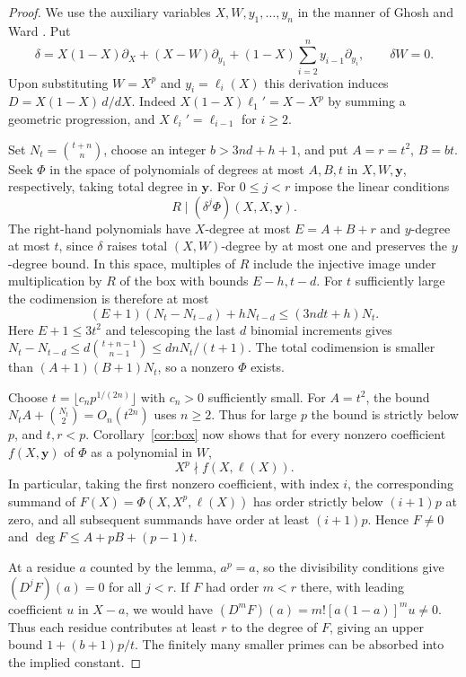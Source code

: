 \begin{proof}
We use the auxiliary variables $X,W,y_1,\ldots,y_n$ in the manner of
Ghosh and Ward \cite[\S3]{GW}. Put
\[
 \delta=X(1-X)\partial_X+(X-W)\partial_{y_1}
             +(1-X)\sum_{i=2}^n y_{i-1}\partial_{y_i},
 \qquad \delta W=0.
\]
Upon substituting $W=X^p$ and $y_i=\ell_i(X)$ this derivation induces
$D=X(1-X)\,d/dX$. Indeed $X(1-X)\ell_1'=X-X^p$ by summing a geometric
progression, and $X\ell_i'=\ell_{i-1}$ for $i\ge2$.

Set $N_t=\binom{t+n}{n}$, choose an integer $b>3nd+h+1$, and put
$A=r=t^2$, $B=bt$. Seek $\Phi$ in the space of polynomials of
degrees at most $A,B,t$ in $X,W,\boldsymbol y$, respectively, taking
total degree in $\boldsymbol y$. For $0\le j<r$ impose the linear conditions
\[
             R\mid (\delta^j\Phi)(X,X,\boldsymbol y).
\]
The right-hand polynomials have $X$-degree at most $E=A+B+r$ and
$y$-degree at most $t$, since $\delta$ raises total $(X,W)$-degree by
at most one and preserves the $y$-degree bound. In this space, multiples
of $R$ include the injective image under multiplication by $R$ of the
box with bounds $E-h,t-d$. For $t$ sufficiently large the codimension is
therefore at most
\[
 (E+1)(N_t-N_{t-d})+hN_{t-d}
       \le (3ndt+h)N_t .
\]
Here $E+1\le 3t^2$ and telescoping the last $d$ binomial increments gives
$N_t-N_{t-d}\le d\binom{t+n-1}{n-1}\le dnN_t/(t+1)$.
The total codimension is smaller than $(A+1)(B+1)N_t$, so a nonzero
$\Phi$ exists.

Choose $t=\lfloor c_n p^{1/(2n)}\rfloor$ with $c_n>0$ sufficiently small.
For $A=t^2$, the bound $N_t A+\binom{N_t}{2}=O_n(t^{2n})$ uses $n\ge2$.
Thus for large $p$ the bound is strictly below $p$, and $t,r<p$.
Corollary~\ref{cor:box} now shows that for every nonzero
coefficient $f(X,\boldsymbol y)$ of $\Phi$ as a polynomial in $W$,
\[
                       X^p\nmid f(X,\boldsymbol\ell(X)).
\]
In particular, taking the first nonzero coefficient, with index $i$,
the corresponding summand of
$F(X)=\Phi(X,X^p,\boldsymbol\ell(X))$ has order strictly below $(i+1)p$
at zero, and all subsequent summands have order at least $(i+1)p$.
Hence $F\ne0$ and $\deg F\le A+pB+(p-1)t$.

At a residue $a$ counted by the lemma, $a^p=a$, so the divisibility
conditions give $(D^jF)(a)=0$ for all $j<r$. If $F$ had order $m<r$
there, with leading coefficient $u$ in $X-a$, we would have
$(D^mF)(a)=m![a(1-a)]^mu\ne0$. Thus each residue contributes at
least $r$ to the degree of $F$, giving an upper bound
$1+(b+1)p/t$. The finitely many smaller primes can be absorbed into the
implied constant.
\end{proof}

